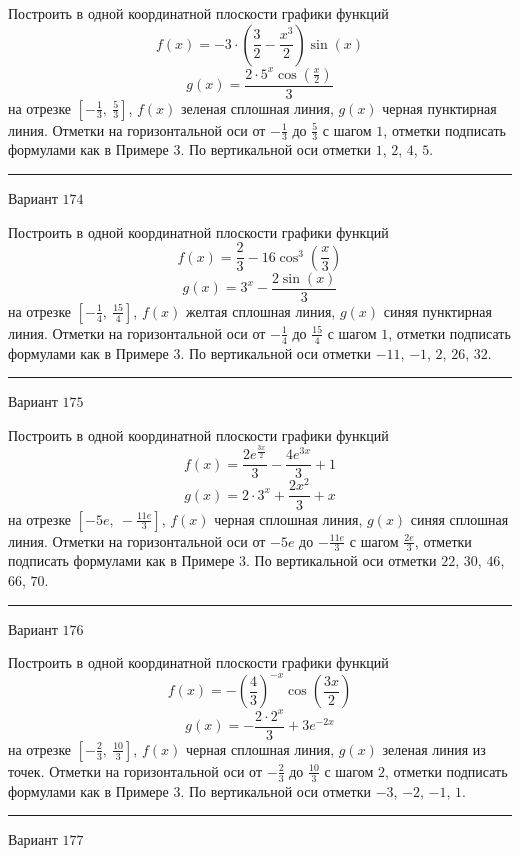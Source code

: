 \documentclass[11pt]{report}
\begin{document}
Построить в одной координатной плоскости графики функций $$f(x) = - 3 \cdot \left(\frac{3}{2} - \frac{x^{3}}{2}\right) \sin{\left(x \right)}$$ $$g(x) = \frac{2 \cdot 5^{x} \cos{\left(\frac{x}{2} \right)}}{3}$$ на отрезке $\left[- \frac{1}{3}, \  \frac{5}{3}\right]$, $f(x)$ зеленая сплошная линия, $g(x)$ черная пунктирная линия. Отметки на горизонтальной оси от $- \frac{1}{3}$ до $\frac{5}{3}$ с шагом $1$, отметки подписать формулами как в Примере 3. По вертикальной оси отметки $1$, $2$, $4$, $5$.
\begin{center}
\noindent\rule{8cm}{0.4pt}
\end{center}
Вариант $174$


Построить в одной координатной плоскости графики функций $$f(x) = \frac{2}{3} - 16 \cos^{3}{\left(\frac{x}{3} \right)}$$ $$g(x) = 3^{x} - \frac{2 \sin{\left(x \right)}}{3}$$ на отрезке $\left[- \frac{1}{4}, \  \frac{15}{4}\right]$, $f(x)$ желтая сплошная линия, $g(x)$ синяя пунктирная линия. Отметки на горизонтальной оси от $- \frac{1}{4}$ до $\frac{15}{4}$ с шагом $1$, отметки подписать формулами как в Примере 3. По вертикальной оси отметки $-11$, $-1$, $2$, $26$, $32$.
\begin{center}
\noindent\rule{8cm}{0.4pt}
\end{center}
Вариант $175$


Построить в одной координатной плоскости графики функций $$f(x) = \frac{2 e^{\frac{3 x}{2}}}{3} - \frac{4 e^{3 x}}{3} + 1$$ $$g(x) = 2 \cdot 3^{x} + \frac{2 x^{2}}{3} + x$$ на отрезке $\left[- 5 e, \  - \frac{11 e}{3}\right]$, $f(x)$ черная сплошная линия, $g(x)$ синяя сплошная линия. Отметки на горизонтальной оси от $- 5 e$ до $- \frac{11 e}{3}$ с шагом $\frac{2 e}{3}$, отметки подписать формулами как в Примере 3. По вертикальной оси отметки $22$, $30$, $46$, $66$, $70$.
\begin{center}
\noindent\rule{8cm}{0.4pt}
\end{center}
Вариант $176$


Построить в одной координатной плоскости графики функций $$f(x) = - \left(\frac{4}{3}\right)^{- x} \cos{\left(\frac{3 x}{2} \right)}$$ $$g(x) = - \frac{2 \cdot 2^{x}}{3} + 3 e^{- 2 x}$$ на отрезке $\left[- \frac{2}{3}, \  \frac{10}{3}\right]$, $f(x)$ черная сплошная линия, $g(x)$ зеленая линия из точек. Отметки на горизонтальной оси от $- \frac{2}{3}$ до $\frac{10}{3}$ с шагом $2$, отметки подписать формулами как в Примере 3. По вертикальной оси отметки $-3$, $-2$, $-1$, $1$.
\begin{center}
\noindent\rule{8cm}{0.4pt}
\end{center}
Вариант $177$
\end{document}
